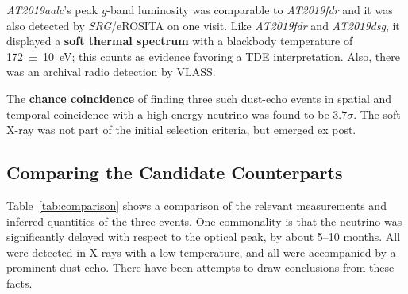 \textit{AT2019aalc}'s peak \textit{g}-band luminosity was comparable to \textit{AT2019fdr} and it was also detected by \textit{SRG}/eROSITA on one visit. Like \textit{AT2019fdr} and \textit{AT2019dsg}, it displayed a \textbf{soft thermal spectrum} with a blackbody temperature of \SI{172\pm10}{\eV}; this counts as evidence favoring a TDE interpretation. Also, there was an archival radio detection by VLASS.

The \textbf{chance coincidence} of finding three such dust-echo events in spatial and temporal coincidence with a high-energy neutrino was found to be $3.7\sigma$. The soft X-ray was not part of the initial selection criteria, but emerged ex post.

\subsection{Comparing the Candidate Counterparts}
Table~\ref{tab:comparison} shows a comparison of the relevant measurements and inferred quantities of the three events. One commonality is that the neutrino was significantly delayed with respect to the optical peak, by about 5--10 months. All were detected in X-rays with a low temperature, and all were accompanied by a prominent dust echo. There have been attempts to draw conclusions from these facts.

